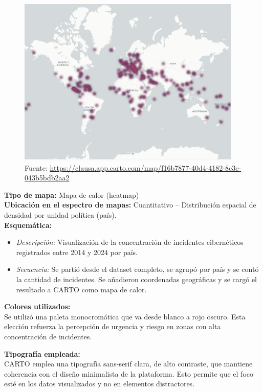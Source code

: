 \documentclass[12pt, a4paper]{article}
\begin{document}
\begin{figure}[H]
    \centering
    \includegraphics[width=0.95\textwidth]{images/Mapa_calor_FC.png}
    \caption[1]{Fuente: \url{https://clausa.app.carto.com/map/f16b7877-40d4-4182-8c3e-043b5bdb2aa2}}
\end{figure}

\textbf{Tipo de mapa:} Mapa de calor (heatmap) \\
\textbf{Ubicación en el espectro de mapas:} Cuantitativo – Distribución espacial de densidad por unidad política (país). \\

\textbf{Esquemática:} \\
\begin{itemize}
    \item \textit{Descripción:} Visualización de la concentración de incidentes cibernéticos registrados entre 2014 y 2024 por país.
    \item \textit{Secuencia:} Se partió desde el dataset completo, se agrupó por país y se contó la cantidad de incidentes. Se añadieron coordenadas geográficas y se cargó el resultado a CARTO como mapa de calor.
\end{itemize}

\textbf{Colores utilizados:} \\
Se utilizó una paleta monocromática que va desde blanco a rojo oscuro. Esta elección refuerza la percepción de urgencia y riesgo en zonas con alta concentración de incidentes.

\textbf{Tipografía empleada:} \\
CARTO emplea una tipografía sans-serif clara, de alto contraste, que mantiene coherencia con el diseño minimalista de la plataforma. Esto permite que el foco esté en los datos visualizados y no en elementos distractores.
\end{document}
